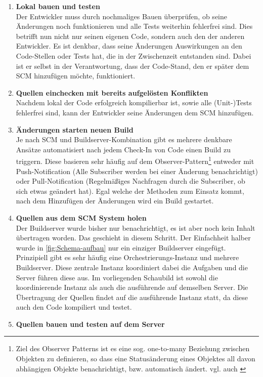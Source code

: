 \begin{enumerate}
		\item \textbf{Lokal bauen und testen}\\%
		Der Entwickler muss durch nochmaliges Bauen überprüfen, ob seine Änderungen noch funktionieren und alle Tests weiterhin fehlerfrei sind. Dies betrifft nun nicht nur seinen eigenen Code, sondern auch den der anderen Entwickler. Es ist denkbar, dass seine Änderungen Auswirkungen an den Code-Stellen oder Tests hat, die in der Zwischenzeit entstanden sind. Dabei ist er selbst in der Verantwortung, dass der Code-Stand, den er später dem SCM hinzufügen möchte, funktioniert. 
		\item \textbf{Quellen einchecken mit bereits aufgelösten Konflikten}\\%
		Nachdem lokal der Code erfolgreich kompilierbar ist, sowie alle (Unit-)Tests fehlerfrei sind, kann der Entwickler seine Änderungen dem SCM hinzufügen.
		\item \textbf{Änderungen starten neuen Build}\\%
		Je nach SCM und Buildserver-Kombination gibt es mehrere denkbare Ansätze automatisiert nach jedem Check-In von Code einen Build zu triggern. Diese basieren sehr häufig auf dem Observer-Pattern\footnote{Ziel des Observer Patterns ist es eine sog. one-to-many Beziehung zwischen Objekten zu definieren, so dass eine Statusänderung eines Objektes all davon abhängigen Objekte benachrichtigt, bzw. automatisch ändert. vgl. auch \cite{hannemann2002design}} entweder mit Push-Notification (Alle Subscriber werden bei einer Änderung benachrichtigt) oder Pull-Notification (Regelmäßiges Nachfragen durch die Subscriber, ob sich etwas geändert hat). Egal welche der Methoden zum Einsatz kommt, nach dem Hinzufügen der Änderungen wird ein Build gestartet.
		\item \textbf{Quellen aus dem SCM System holen}\\%
		Der Buildserver wurde bisher nur benachrichtigt, es ist aber noch kein Inhalt übertragen worden. Das geschieht in diesem Schritt. Der Einfachheit halber wurde in \autoref{fig:Schema-aufbau} nur ein einziger Buildserver eingefügt. Prinzipiell gibt es sehr häufig eine Orchestrierungs-Instanz und mehrere Buildserver. Diese zentrale Instanz koordiniert dabei die Aufgaben und die Server führen diese aus. Im vorliegenden Schaubild ist sowohl die koordinierende Instanz als auch die ausführende auf demselben Server. Die Übertragung der Quellen findet auf die ausführende Instanz statt, da diese auch den Code kompiliert und testet.
		\item \textbf{Quellen bauen und testen auf dem Server}\\%

\end{enumerate}

